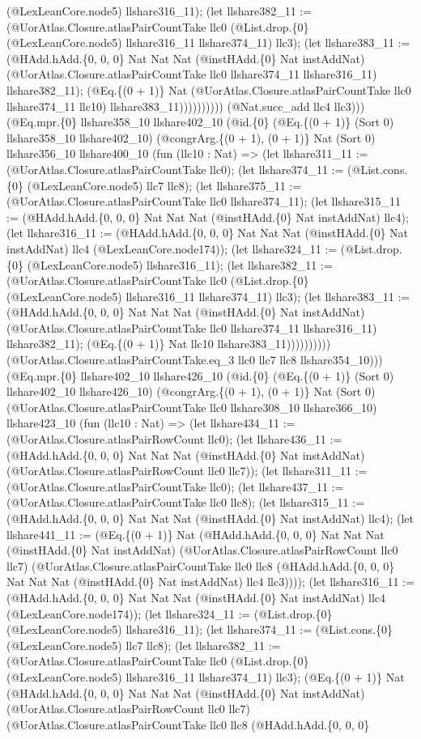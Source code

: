 \documentclass[11pt]{article}
\begin{document}
(@LexLeanCore.node5) llshare316\_11); (let llshare382\_11 := (@UorAtlas.Closure.atlasPairCountTake llc0 (@List.drop.\{0\} (@LexLeanCore.node5) llshare316\_11 llshare374\_11) llc3); (let llshare383\_11 := (@HAdd.hAdd.\{0, 0, 0\} Nat Nat Nat (@instHAdd.\{0\} Nat instAddNat) (@UorAtlas.Closure.atlasPairCountTake llc0 llshare374\_11 llshare316\_11) llshare382\_11); (@Eq.\{(0 + 1)\} Nat (@UorAtlas.Closure.atlasPairCountTake llc0 llshare374\_11 llc10) llshare383\_11)))))))))) (@Nat.succ\_add llc4 llc3))) (@Eq.mpr.\{0\} llshare358\_10 llshare402\_10 (@id.\{0\} (@Eq.\{(0 + 1)\} (Sort 0) llshare358\_10 llshare402\_10) (@congrArg.\{(0 + 1), (0 + 1)\} Nat (Sort 0) llshare356\_10 llshare400\_10 (fun (llc10 : Nat) => (let llshare311\_11 := (@UorAtlas.Closure.atlasPairCountTake llc0); (let llshare374\_11 := (@List.cons.\{0\} (@LexLeanCore.node5) llc7 llc8); (let llshare375\_11 := (@UorAtlas.Closure.atlasPairCountTake llc0 llshare374\_11); (let llshare315\_11 := (@HAdd.hAdd.\{0, 0, 0\} Nat Nat Nat (@instHAdd.\{0\} Nat instAddNat) llc4); (let llshare316\_11 := (@HAdd.hAdd.\{0, 0, 0\} Nat Nat Nat (@instHAdd.\{0\} Nat instAddNat) llc4 (@LexLeanCore.node174)); (let llshare324\_11 := (@List.drop.\{0\} (@LexLeanCore.node5) llshare316\_11); (let llshare382\_11 := (@UorAtlas.Closure.atlasPairCountTake llc0 (@List.drop.\{0\} (@LexLeanCore.node5) llshare316\_11 llshare374\_11) llc3); (let llshare383\_11 := (@HAdd.hAdd.\{0, 0, 0\} Nat Nat Nat (@instHAdd.\{0\} Nat instAddNat) (@UorAtlas.Closure.atlasPairCountTake llc0 llshare374\_11 llshare316\_11) llshare382\_11); (@Eq.\{(0 + 1)\} Nat llc10 llshare383\_11)))))))))) (@UorAtlas.Closure.atlasPairCountTake.eq\_3 llc0 llc7 llc8 llshare354\_10))) (@Eq.mpr.\{0\} llshare402\_10 llshare426\_10 (@id.\{0\} (@Eq.\{(0 + 1)\} (Sort 0) llshare402\_10 llshare426\_10) (@congrArg.\{(0 + 1), (0 + 1)\} Nat (Sort 0) (@UorAtlas.Closure.atlasPairCountTake llc0 llshare308\_10 llshare366\_10) llshare423\_10 (fun (llc10 : Nat) => (let llshare434\_11 := (@UorAtlas.Closure.atlasPairRowCount llc0); (let llshare436\_11 := (@HAdd.hAdd.\{0, 0, 0\} Nat Nat Nat (@instHAdd.\{0\} Nat instAddNat) (@UorAtlas.Closure.atlasPairRowCount llc0 llc7)); (let llshare311\_11 := (@UorAtlas.Closure.atlasPairCountTake llc0); (let llshare437\_11 := (@UorAtlas.Closure.atlasPairCountTake llc0 llc8); (let llshare315\_11 := (@HAdd.hAdd.\{0, 0, 0\} Nat Nat Nat (@instHAdd.\{0\} Nat instAddNat) llc4); (let llshare441\_11 := (@Eq.\{(0 + 1)\} Nat (@HAdd.hAdd.\{0, 0, 0\} Nat Nat Nat (@instHAdd.\{0\} Nat instAddNat) (@UorAtlas.Closure.atlasPairRowCount llc0 llc7) (@UorAtlas.Closure.atlasPairCountTake llc0 llc8 (@HAdd.hAdd.\{0, 0, 0\} Nat Nat Nat (@instHAdd.\{0\} Nat instAddNat) llc4 llc3)))); (let llshare316\_11 := (@HAdd.hAdd.\{0, 0, 0\} Nat Nat Nat (@instHAdd.\{0\} Nat instAddNat) llc4 (@LexLeanCore.node174)); (let llshare324\_11 := (@List.drop.\{0\} (@LexLeanCore.node5) llshare316\_11); (let llshare374\_11 := (@List.cons.\{0\} (@LexLeanCore.node5) llc7 llc8); (let llshare382\_11 := (@UorAtlas.Closure.atlasPairCountTake llc0 (@List.drop.\{0\} (@LexLeanCore.node5) llshare316\_11 llshare374\_11) llc3); (@Eq.\{(0 + 1)\} Nat (@HAdd.hAdd.\{0, 0, 0\} Nat Nat Nat (@instHAdd.\{0\} Nat instAddNat) (@UorAtlas.Closure.atlasPairRowCount llc0 llc7) (@UorAtlas.Closure.atlasPairCountTake llc0 llc8 (@HAdd.hAdd.\{0, 0, 0\} 
\end{document}
